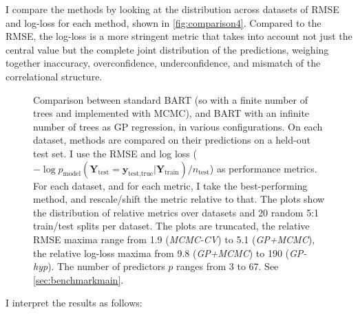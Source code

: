 \documentclass[a4paper]{article}
\theoremstyle{definition}
\newcommand{\widecenter}[1]{\noindent\hspace{-\textwidth}\makebox[3\textwidth][c]{#1}}
\newcommand{\includempl}[1]{\texttt{[image: \#1]}}
\begin{document}
    I compare the methods by looking at the distribution across datasets of RMSE and log-loss for each method, shown in \autoref{fig:comparison4}. Compared to the RMSE, the log-loss is a more stringent metric that takes into account not just the central value but the complete joint distribution of the predictions, weighing together inaccuracy, overconfidence, underconfidence, and mismatch of the correlational structure.
    \begin{figure}
        
        \widecenter{\includempl{articleplot}}
        
        \caption{\label{fig:comparison4} Comparison between standard BART (so with a finite number of trees and implemented with MCMC), and BART with an infinite number of trees as GP regression, in various configurations. On each dataset, methods are compared on their predictions on a held-out test set. I use the RMSE and log loss ($-\log p_\text{model}(\mathbf Y_\text{test}=\mathbf y_\text{test,true}|\mathbf Y_\text{train})/n_\text{test}$) as performance metrics. For each dataset, and for each metric, I take the best-performing method, and rescale/shift the metric relative to that. The plots show the distribution of relative metrics over datasets and 20 random 5:1 train/test splits per dataset. The plots are truncated, the relative RMSE maxima range from 1.9 (\emph{MCMC-CV}) to 5.1 (\emph{GP+MCMC}), the relative log-loss maxima from 9.8 (\emph{GP+MCMC}) to 190 (\emph{GP-hyp}). The number of predictors $p$ ranges from 3 to 67. See \autoref{sec:benchmarkmain}.}
        
    \end{figure}
    I interpret the results as follows:
\end{document}
